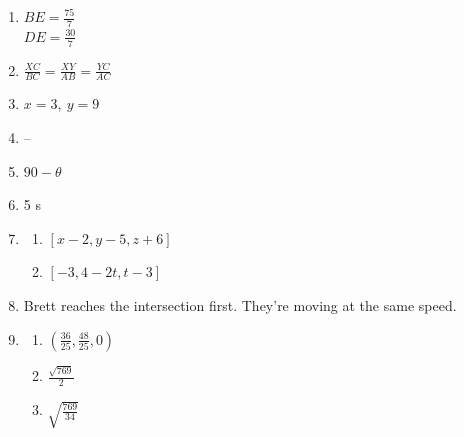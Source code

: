 \documentclass{article}
\begin{document}
\begin{enumerate}
	\begin{enumerate}
	
	\item $\frac{AB}{CD} = 2$
	
	\item $CP$
	
	\item --
	
	\item $PC = \frac{10}{3}$ \\
		$AP = \frac{20}{3}$
		
	\end{enumerate}
	
\item $BE = \frac{75}{7}$ \\
	$DE = \frac{30}{7}$
	
\item $\frac{XC}{BC} = \frac{XY}{AB} = \frac{YC}{AC}$

\item $x = 3, \ y = 9$ \\

\item --

\item $90 - \theta$

\item 5 s

\item

	\begin{enumerate}
	
	\item $[x - 2, y - 5, z + 6]$
	
	\item $[-3, 4-2t, t-3]$
	
	\end{enumerate}
	
\item Brett reaches the intersection first. They're moving at the same speed.

\item

	\begin{enumerate}
	
	\item $(\frac{36}{25}, \frac{48}{25}, 0)$
	
	\item $\frac{\sqrt{769}}{2}$
	
	\item $\sqrt{\frac{769}{34}}$
	

\end{enumerate}
\end{enumerate}
\end{document}
